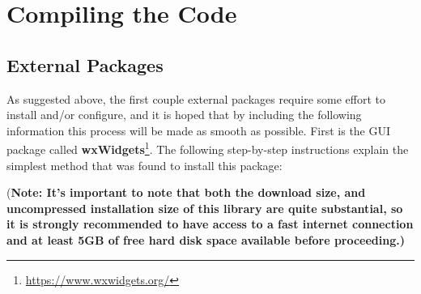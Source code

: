 \documentclass[12pt]{report}
\begin{document}
\section{Compiling the Code}
\subsection*{External Packages}
\indent As suggested above, the first couple external packages require some effort to install and/or configure, and it is hoped that by including the following information this process will be made as smooth as possible. First is the GUI package called {\bf wxWidgets}\footnote{\url{https://www.wxwidgets.org/}}. The following step-by-step instructions explain the simplest method that was found to install this package:

\indent({\footnotesize\bf Note: It's important to note that both the download size, and uncompressed installation size of this library are quite substantial, so it is strongly recommended to have access to a fast internet connection and at least 5GB of free hard disk space available before proceeding.)}
\end{document}

